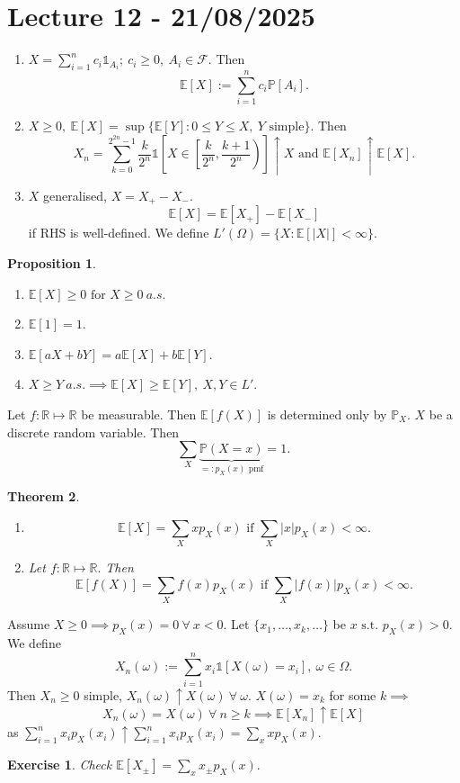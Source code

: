 \documentclass{article}
\newcommand{\1}{\mathds{1}}
\newcommand{\R}{\mathbb{R}}
\newcommand{\E}{\mathbb{E}}
\newcommand{\F}{\mathcal{F}}
\newcommand{\PB}{\mathbb{P}}
\newcommand{\lf}{\left}
\newcommand{\rg}{\right}
\newcommand{\f}[2]{\frac{#1}{#2}}
\newcommand{\st}{\text{ s.t. }}
\newcommand{\tb}[1]{\lf[#1\rg]}
\newcommand{\card}[1]{\lf\vert #1\rg\vert}
\newtheorem{theorem}{Theorem}[section]
\newtheorem{proposition}[theorem]{Proposition}
\newtheorem{exercise}{Exercise}
\begin{document}
\section{Lecture 12 - 21/08/2025}
\begin{enumerate}
    \item $X=\sum_{i=1}^nc_i\1_{A_i};\ c_i\geq 0,\ A_i\in\F.$ Then $$\E[X]:=\sum_{i=1}^nc_i\PB[A_i].$$
    \item $X\geq 0,\ \E[X]=\sup\{\E[Y]:0\leq Y\leq X,\ Y\text{ simple}\}.$ Then $$X_n=\sum_{k=0}^{2^{2n}-1}\f k{2^n}\1\tb{X\in\lf[\f k{2^n},\f{k+1}{2^n}\rg)}\uparrow X\text{ and }\E[X_n]\uparrow\E[X].$$
    \item $X$ generalised, $X=X_+-X_-.$ $$\E[X]=\E[X_+]-\E[X_-]$$ if RHS is well-defined. We define $L'(\Omega)=\{X:\E[\card{X}]<\infty\}.$
\end{enumerate}
\begin{proposition}
    \begin{enumerate}
        \item $\E[X]\geq 0\text{ for }X\geq 0\ a.s.$
        \item $\E[1]=1.$
        \item $\E[aX+bY]=a\E[X]+b\E[Y].$
        \item $X\geq Y\ a.s.\implies \E[X]\geq \E[Y],\ X,Y\in L'.$
    \end{enumerate}
\end{proposition}
Let $f:\R\mapsto\R$ be measurable. Then $\E[f(X)]$ is determined only by $\PB_X.$ $X$ be a discrete random variable. Then $$\sum_X\underbrace{\PB(X=x)}_{=:p_X(x)\text{ pmf}}=1.$$ 
\begin{theorem}
    \begin{enumerate}
        \item $$\E[X]=\sum_Xxp_X(x)\text{ if }\sum_X\card{x}p_X(x)<\infty.$$
        \item Let $f:\R\mapsto\R.$ Then $$\E[f(X)]=\sum_Xf(x)p_X(x)\text{ if }\sum_X\card{f(x)}p_X(x)<\infty.$$
    \end{enumerate}
\end{theorem}
Assume $X\geq 0\implies p_X(x)=0\ \forall\ x<0.$ Let $\{x_1,\ldots,x_k,\ldots\}$ be $x\st p_X(x)>0.$ We define $$X_n(\omega):=\sum_{i=1}^nx_i\1[X(\omega)=x_i],\ \omega\in\Omega.$$ Then $X_n\geq 0$ simple, $X_n(\omega)\uparrow X(\omega)\ \forall\ \omega.$ $X(\omega)=x_k$ for some $k\implies$$$ X_n(\omega)=X(\omega)\ \forall\ n\geq k\implies \E[X_n]\uparrow \E[X]$$ as $\sum_{i=1}^nx_ip_X(x_i)\uparrow\sum_{i=1}^nx_ip_X(x_i)=\sum_xxp_X(x).$
\begin{exercise}
Check $\E[X_\pm]=\sum_xx_\pm p_X(x).$   
\end{exercise}
\end{document}
